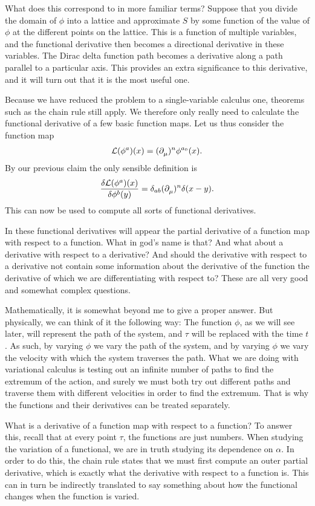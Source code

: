 What does this correspond to in more familiar terms? Suppose that you divide the domain of $\phi$ into a lattice and approximate $S$ by some function of the value of $\phi$ at the different points on the lattice. This is a function of multiple variables, and the functional derivative then becomes a directional derivative in these variables. The Dirac delta function path becomes a derivative along a path parallel to a particular axis. This provides an extra significance to this derivative, and it will turn out that it is the most useful one.

Because we have reduced the problem to a single-variable calculus one, theorems such as the chain rule still apply. We therefore only really need to calculate the functional derivative of a few basic function maps. Let us thus consider the function map
\begin{align*}
	\mathcal{L}(\phi^{a})(x) = (\partial^{}_{\mu})^{n}\phi^{a_{0}}(x).
\end{align*}
By our previous claim the only sensible definition is
\begin{align*}
	\fdv{\lag(\phi^{a})(x)}{\phi^{b}(y)} = \delta_{ab}(\del{}{\mu})^{n}\delta(x - y).
\end{align*}
This can now be used to compute all sorts of functional derivatives.

In these functional derivatives will appear the partial derivative of a function map with respect to a function. What in god's name is that? And what about a derivative with respect to a derivative? And should the derivative with respect to a derivative not contain some information about the derivative of the function the derivative of which we are differentiating with respect to? These are all very good and somewhat complex questions.

Mathematically, it is somewhat beyond me to give a proper answer. But physically, we can think of it the following way: The function $\phi$, as we will see later, will represent the path of the system, and $\tau$ will be replaced with the time $t$. As such, by varying $\phi$ we vary the path of the system, and by varying $\phi$ we vary the velocity with which the system traverses the path. What we are doing with variational calculus is testing out an infinite number of paths to find the extremum of the action, and surely we must both try out different paths and traverse them with different velocities in order to find the extremum. That is why the functions and their derivatives can be treated separately.

What is a derivative of a function map with respect to a function? To answer this, recall that at every point $\tau$, the functions are just numbers. When studying the variation of a functional, we are in truth studying its dependence on $\alpha$. In order to do this, the chain rule states that we must first compute an outer partial derivative, which is exactly what the derivative with respect to a function is. This can in turn be indirectly translated to say something about how the functional changes when the function is varied.

